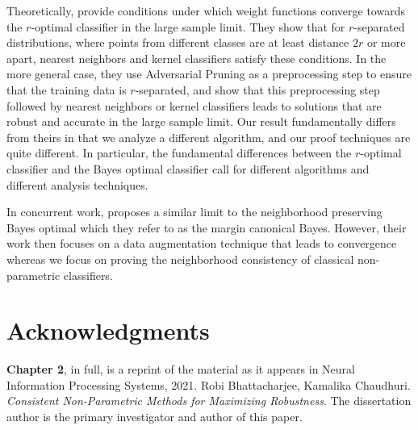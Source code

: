 
Theoretically, \cite{Bhattacharjee20} provide conditions under which weight functions converge towards the $r$-optimal classifier in the large sample limit. They show that for $r$-separated distributions, where points from different classes are at least distance $2r$ or more apart, nearest neighbors and kernel classifiers satisfy these conditions. In the more general case, they use Adversarial Pruning as a preprocessing step to ensure that the training data is $r$-separated, and show that this preprocessing step followed by nearest neighbors or kernel classifiers leads to solutions that are robust and accurate in the large sample limit. Our result fundamentally differs from theirs in that we analyze a different algorithm, and our proof techniques are quite different. In particular, the fundamental differences between the $r$-optimal classifier and the \natural\emph{ }Bayes optimal classifier call for different algorithms and different analysis techniques.

In concurrent work, \cite{Chowdhury21} proposes a similar limit to the neighborhood preserving Bayes optimal which they refer to as the margin canonical Bayes. However, their work then focuses on a data augmentation technique that leads to convergence whereas we focus on proving the neighborhood consistency of classical non-parametric classifiers.

\section*{Acknowledgments}

\textbf{Chapter 2}, in full, is a reprint of the material as it appears in Neural Information Processing Systems, 2021. Robi Bhattacharjee, Kamalika Chaudhuri. \emph{Consistent Non-Parametric Methods for Maximizing Robustness}. The dissertation author is the primary investigator and author of this paper. 



%
%
%
%
%
%
%